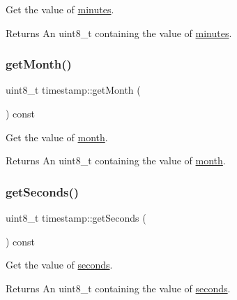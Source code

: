 Get the value of \mbox{\hyperlink{classtimestamp_a45c06ef17b96bdd37cd168faf772c63c}{minutes}}. 

\begin{DoxyReturn}{Returns}
An uint8\+\_\+t containing the value of \mbox{\hyperlink{classtimestamp_a45c06ef17b96bdd37cd168faf772c63c}{minutes}}. 
\end{DoxyReturn}
\mbox{\label{classtimestamp_a7225435b1a1ee20ae0dd8708f8e68ee8}} 
\subsubsection{\texorpdfstring{get\+Month()}{getMonth()}}
{\footnotesize\ttfamily uint8\+\_\+t timestamp\+::get\+Month (\begin{DoxyParamCaption}{ }\end{DoxyParamCaption}) const}



Get the value of \mbox{\hyperlink{classtimestamp_a71df69b7ebb5a6dd228f4ae70b954505}{month}}. 

\begin{DoxyReturn}{Returns}
An uint8\+\_\+t containing the value of \mbox{\hyperlink{classtimestamp_a71df69b7ebb5a6dd228f4ae70b954505}{month}}. 
\end{DoxyReturn}
\mbox{\label{classtimestamp_a9212a15c81b0f77b576257cba2805253}} 
\subsubsection{\texorpdfstring{get\+Seconds()}{getSeconds()}}
{\footnotesize\ttfamily uint8\+\_\+t timestamp\+::get\+Seconds (\begin{DoxyParamCaption}{ }\end{DoxyParamCaption}) const}



Get the value of \mbox{\hyperlink{classtimestamp_a15ad236c6963bfbd6ae18416697c91c2}{seconds}}. 

\begin{DoxyReturn}{Returns}
An uint8\+\_\+t containing the value of \mbox{\hyperlink{classtimestamp_a15ad236c6963bfbd6ae18416697c91c2}{seconds}}. 
\end{DoxyReturn}
\mbox{\label{classtimestamp_a21c6dd709bb29c95cea2641f26c6c088}} 
